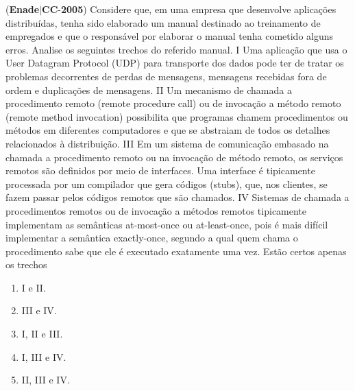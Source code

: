 \documentclass{exam}
\begin{document}
\begin{questions}
\question (\textbf{Enade}$|$\textbf{CC}-\textbf{2005}) Considere que, em uma empresa que desenvolve aplicações
distribuídas, tenha sido elaborado um manual destinado ao
treinamento de empregados e que o responsável por elaborar o
manual tenha cometido alguns erros. Analise os seguintes
trechos do referido manual.
I Uma aplicação que usa o User Datagram Protocol (UDP)
para transporte dos dados pode ter de tratar os problemas
decorrentes de perdas de mensagens, mensagens recebidas
fora de ordem e duplicações de mensagens.
II Um mecanismo de chamada a procedimento remoto (remote
procedure call) ou de invocação a método remoto (remote
method invocation) possibilita que programas chamem
procedimentos ou métodos em diferentes computadores e
que se abstraiam de todos os detalhes relacionados à
distribuição.
III Em um sistema de comunicação embasado na chamada a
procedimento remoto ou na invocação de método remoto, os
serviços remotos são definidos por meio de interfaces. Uma
interface é tipicamente processada por um compilador que
gera códigos (stubs), que, nos clientes, se fazem passar pelos
códigos remotos que são chamados.
IV Sistemas de chamada a procedimentos remotos ou de
invocação a métodos remotos tipicamente implementam as
semânticas at-most-once ou at-least-once, pois é mais difícil
implementar a semântica exactly-once, segundo a qual quem
chama o procedimento sabe que ele é executado exatamente
uma vez.
Estão certos apenas os trechos
	\begin{enumerate}[label=\alph*)]
		\item  I e II.
		\item  III e IV.
		\item  I, II e III.
		\item  I, III e IV.
		\item  II, III e IV.

	\end{enumerate}


\end{questions}
\end{document}
